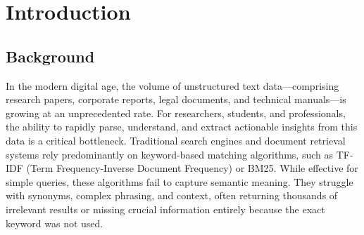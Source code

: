 \documentclass[12pt, a4paper]{report}
\begin{document}
\begin{abstract}
The exponential growth of digital information has made traditional methods of research and data synthesis highly inefficient. Researchers are often burdened with reading hundreds of pages of unstructured documents to extract specific insights. While Large Language Models (LLMs) have revolutionized natural language processing, their direct application in academic and professional research is hindered by their propensity to hallucinate and their lack of access to private, proprietary data. This report details the design and development of an "Intelligent Research Assistant," a comprehensive full-stack application aimed at mitigating these issues using Retrieval-Augmented Generation (RAG). By integrating a secure backend (FastAPI, SQLAlchemy), a sophisticated document processing and chunking pipeline, dense vector embeddings (SentenceTransformers), highly efficient vector storage (FAISS), and a locally deployed LLM (Llama 3 via Ollama), the system provides context-aware, highly accurate answers grounded strictly in user-uploaded documents. Furthermore, the system includes a citation engine that attributes every claim to specific source chunks, ensuring transparency and reliability. This project demonstrates a robust, privacy-first architectural approach to deploying advanced AI in real-world, multi-tenant web applications.
\end{abstract}

\tableofcontents
\listoffigures
\newpage

\chapter{Introduction}

\section{Background}
In the modern digital age, the volume of unstructured text data—comprising research papers, corporate reports, legal documents, and technical manuals—is growing at an unprecedented rate. For researchers, students, and professionals, the ability to rapidly parse, understand, and extract actionable insights from this data is a critical bottleneck. Traditional search engines and document retrieval systems rely predominantly on keyword-based matching algorithms, such as TF-IDF (Term Frequency-Inverse Document Frequency) or BM25. While effective for simple queries, these algorithms fail to capture semantic meaning. They struggle with synonyms, complex phrasing, and context, often returning thousands of irrelevant results or missing crucial information entirely because the exact keyword was not used.
\end{document}
